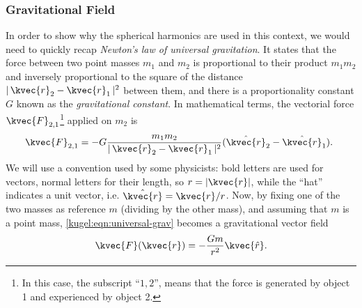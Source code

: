 \subsubsection{Gravitational Field}

In order to show why the spherical harmonics are used in this context, we would
need to quickly recap \emph{Newton's law of universal gravitation}. It states
that the force between two point masses $m_1$ and $m_2$ is proportional to their
product $m_1 m_2$ and inversely proportional to the square of the distance
$|\,\kvec{r}_2-\kvec{r}_1 \,|^2$ between them, and there is a proportionality
constant $G$ known as the \emph{gravitational constant}. In mathematical terms,
the vectorial force $\kvec{F}_{2,1}$\footnote{In this case, the subscript
``$1,2$'',  means that the force is generated by object 1 and experienced by
object 2.} applied on $m_2$ is
\begin{equation}
  \kvec{F}_{2,1} = -G\frac{m_1m_2}{|\, \kvec{r}_2 - \kvec{r}_1 \,|^2}
    ( \hat{\kvec{r}}_2-\hat{\kvec{r}}_1 ).\
    \label{kugel:eqn:universal-grav}
\end{equation}
We will use a convention used by some physicists: bold letters are used for
vectors, normal letters for their length, so $r = |\kvec{r}|$, while the ``hat''
indicates a unit vector, i.e. $ \hat{\kvec{r}} = \kvec{r}/r$.  Now, by fixing
one of the two masses as reference $m$ (dividing by the other mass), and
assuming that $m$ is a point mass, \eqref{kugel:eqn:universal-grav} becomes a
gravitational vector field
\begin{equation}
  \label{kugel:eqn:grav-vec-field}
  \kvec{F}(\kvec{r}) = -\frac{Gm}{r^2}\kvec{\hat{r}}.
\end{equation}

